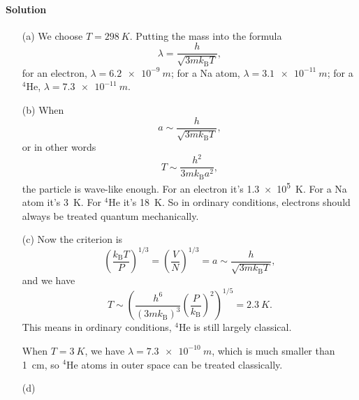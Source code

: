 \documentclass[hyperref, a4paper]{article}
\begin{document}
\paragraph{Solution} \begin{itemize}
\item[(a)] We choose $T = \SI{298}{K}$.
Putting the mass into the formula
\begin{equation}
    \lambda = \frac{h}{\sqrt{3 m k_{\text{B}} T}},
\end{equation}
for an electron, $\lambda = \SI{6.2e-9}{m}$;
for a Na atom, $\lambda = \SI{3.1e-11}{m}$;
for a $^4$He, $\lambda = \SI{7.3e-11}{m}$.
\item[(b)] When 
\begin{equation}
    a \sim \frac{h}{\sqrt{3 m k_{\text{B}} T} },
\end{equation}
or in other words 
\begin{equation}
    T \sim \frac{h^2}{3 m k_{\text{B}} a^2},
\end{equation}
the particle is wave-like enough.
For an electron it's \SI{1.3e5}{K}.
For a Na atom it's \SI{3}{K}.
For $^4$He it's \SI{18}{K}.
So in ordinary conditions, 
electrons should always be treated quantum mechanically.

\item[(c)] Now the criterion is 
\begin{equation}
    \left(\frac{k_{\text{B}} T}{P}\right)^{1/3} = \left(\frac{V}{N}\right)^{1/3} = a \sim \frac{h}{\sqrt{3 m k_{\text{B}} T} },
\end{equation}
and we have 
\begin{equation}
    T \sim \left( \frac{h^6}{(3 m k_{\text{B}})^3} \left( \frac{P}{k_{\text{B}}} \right)^2 \right)^{1/5} 
    = \SI{2.3}{K}.
\end{equation}
This means in ordinary conditions, 
$^4$He is still largely classical.

When $T = \SI{3}{K}$, we have $\lambda = \SI{7.3e-10}{m}$,
which is much smaller than \SI{1}{cm},
so $^4$He atoms in outer space can be treated classically.

\item[(d)] 

\end{itemize}
\end{document}

